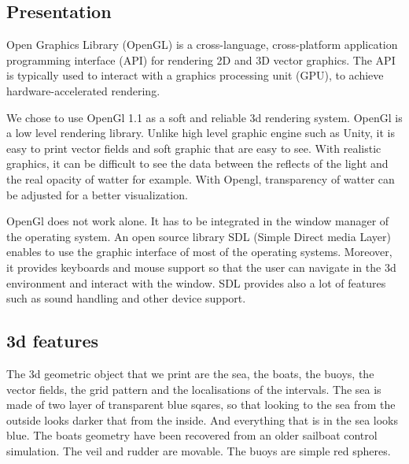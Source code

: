 \documentclass[a4paper]{report}
\begin{document}
\subsection{Presentation}

Open Graphics Library (OpenGL) is a cross-language, cross-platform application programming interface (API) for rendering 2D and 3D vector graphics. The API is typically used to interact with a graphics processing unit (GPU), to achieve hardware-accelerated rendering.

We chose to use OpenGl 1.1 as a soft and reliable 3d rendering system. OpenGl is a low level rendering library. Unlike high level graphic engine such as Unity, it is easy to print vector fields and soft graphic that are easy to see. With realistic graphics, it can be difficult to see the data between the reflects of the light and the real opacity of watter for example. With Opengl, transparency of watter can be adjusted for a better visualization.

OpenGl does not work alone. It has to be integrated in the window manager of the operating system. An open source library SDL (Simple Direct media Layer) enables to use the graphic interface of most of the operating systems. Moreover, it provides keyboards and mouse support so that the user can navigate in the 3d environment and interact with the window. SDL provides also a lot of features such as sound handling and other device support.
 
\subsection{3d features}

The 3d geometric object that we print are the sea, the boats, the buoys, the vector fields, the grid pattern and the localisations of the intervals. The sea is made of two layer of transparent blue sqares, so that looking to the sea from the outside looks darker that from the inside. And everything that is in the sea looks blue. The boats geometry have been recovered from an older sailboat control simulation. The veil and rudder are movable. The buoys are simple red spheres.
\end{document}
